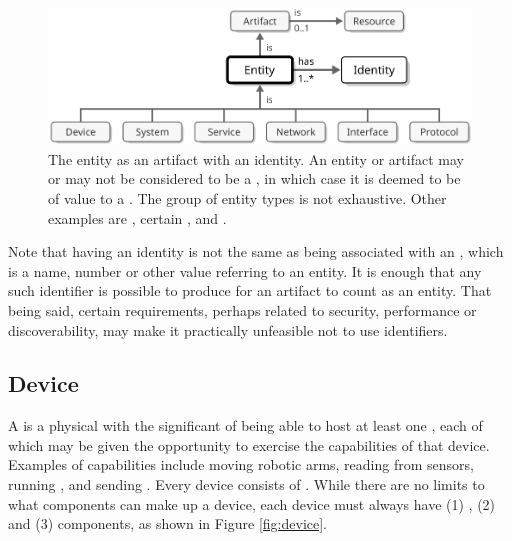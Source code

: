 \begin{figure}[ht!]
  \centering
  \includegraphics[scale=0.9]{figures/entity}
  \caption{
    The entity as an artifact with an identity.
    An entity or artifact may or may not be considered to be a , in which case it is deemed to be of value to a .
    The group of entity types is not exhaustive.
    Other examples are , certain ,  and .
  }
  \label{fig:entity}
\end{figure}


Note that having an identity is not the same as being associated with an , which is a name, number or other value referring to an entity.
It is enough that any such identifier is possible to produce for an artifact to count as an entity.
That being said, certain  requirements, perhaps related to security, performance or discoverability, may make it practically unfeasible not to use identifiers.

\subsection{Device}
\label{sec:concepts:device}

A  is a physical  with the significant  of being able to host at least one , each of which may be given the opportunity to exercise the capabilities of that device.
Examples of capabilities include moving robotic arms, reading from sensors, running , and sending . 
Every device consists of .
While there are no limits to what components can make up a device, each device must always have (1) , (2)  and (3)  components, as shown in Figure \ref{fig:device}.

